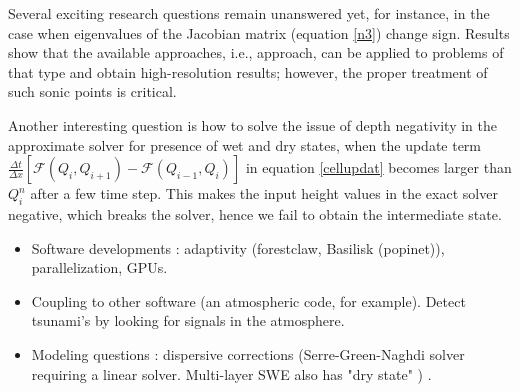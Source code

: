 \documentclass[10pt,a4paper]{article}
\newcommand{\donna}[1]{{\color{red}{#1}}}
\begin{document}
	
	Several exciting research questions remain unanswered yet, for instance, in the case when eigenvalues of the Jacobian matrix (equation \eqref{n3}) change sign. Results show that the available approaches, i.e.,  \citet{ba-le-mi-ro:2003} approach, can be applied to problems of that type and obtain high-resolution results; however, the proper treatment of such sonic points is critical. 
	
	Another interesting question is  how to solve the issue of depth negativity in the approximate solver for presence of wet and dry states, when the update term $  \frac{\Delta t}{\Delta x} \left[ \mathcal{F}(Q_{i} , Q_{i+1} ) - \mathcal{F}(Q_{i-1} , Q_{i} ) \right]$ in equation \eqref{cellupdat} becomes larger than $Q_{i}^{n}$  after a few time step. This makes the input height values in the exact solver negative, which breaks the solver, hence we fail to obtain the intermediate state. 

	\donna{This still needs to be expanded more.  Maybe I don't have the latest version? }

	\begin{itemize}
	\item Software developments : adaptivity (forestclaw, Basilisk (popinet)), parallelization, GPUs. \cite{qi-le-mo:2018,po:2015,be-ge-le-ma:2011}   
	\item Coupling to other software (an atmospheric code, for example).  Detect tsunami's by looking for signals in the atmosphere.
	\item Modeling questions : dispersive corrections (Serre-Green-Naghdi solver  requiring a linear solver.  Multi-layer SWE also has "dry state" ) \cite{la-bo:2009,po:2020,po:2015}.
	\end{itemize}
	
	
	
	
	
	
	
	
	
\end{document}

